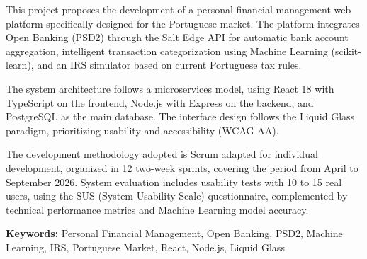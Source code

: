 This project proposes the development of a personal financial management web platform specifically designed for the Portuguese market. The platform integrates Open Banking (PSD2) through the Salt Edge API for automatic bank account aggregation, intelligent transaction categorization using Machine Learning (scikit-learn), and an IRS simulator based on current Portuguese tax rules.

The system architecture follows a microservices model, using React 18 with TypeScript on the frontend, Node.js with Express on the backend, and PostgreSQL as the main database. The interface design follows the Liquid Glass paradigm, prioritizing usability and accessibility (WCAG AA).

The development methodology adopted is Scrum adapted for individual development, organized in 12 two-week sprints, covering the period from April to September 2026. System evaluation includes usability tests with 10 to 15 real users, using the SUS (System Usability Scale) questionnaire, complemented by technical performance metrics and Machine Learning model accuracy.

\vspace{0.5cm}
\noindent\textbf{Keywords:} Personal Financial Management, Open Banking, PSD2, Machine Learning, IRS, Portuguese Market, React, Node.js, Liquid Glass
